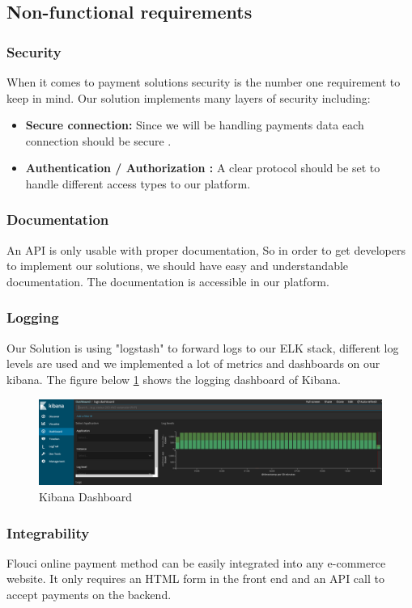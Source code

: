 \begin{spacing}{1.2}
\subsection{Non-functional requirements}
\subsubsection{Security}
When it comes to payment solutions security is the number one requirement to keep in mind.
Our solution implements many layers of security including: 
\begin{itemize}
	\item \textbf{Secure connection:} Since we will be handling payments data each connection should be secure .
	\item \textbf{Authentication / Authorization :}  A clear protocol should be set to handle different access types to our platform.
    \end{itemize}
\subsubsection{Documentation}
An API is only usable with proper documentation, So in order to get developers to implement our solutions, we should have easy and understandable documentation. The documentation is accessible in our platform.\subsubsection{Logging}
Our Solution is using "logstash" to forward logs to our ELK\cite{ELK} stack, different log levels are used and we implemented a lot of metrics and dashboards on our kibana.
The figure below \ref{fig:kibana} shows the logging dashboard of Kibana.
\begin{figure}[H]\centering
\includegraphics[scale=0.3]{ELK.png}
\caption{Kibana Dashboard}
\label{fig:kibana}
\end{figure}

\subsubsection{Integrability}
Flouci online payment method can be easily integrated into any e-commerce website. It only requires an HTML form in the front end and an API call to accept payments on the backend.


\end{spacing}
